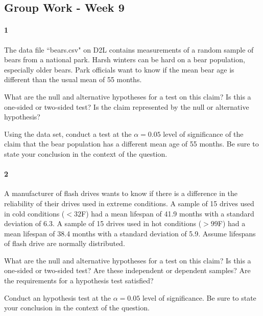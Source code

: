 \documentclass{article}
\begin{document}
\begin{flushleft}
\section*{Group Work - Week 9}

\paragraph{1} The data file ``bears.csv" on D2L contains measurements of a random sample of bears from a national park. Harsh winters can be hard on a bear population, especially older bears. Park officials want to know if the mean bear age is different than the usual mean of 55 months.

\begin{enumalpha}
\item What are the null and alternative hypotheses for a test on this claim? Is this a one-sided or two-sided test? Is the claim represented by the null or alternative hypothesis?
\vspace{2.5in}
\item Using the data set, conduct a test at the $\alpha = 0.05$ level of significance of the claim that the bear population has a different mean age of 55 months. Be sure to state your conclusion in the context of the question.
\end{enumalpha}

\newpage
\paragraph{2} A manufacturer of flash drives wants to know if there is a difference in the reliability of their drives used in extreme conditions. A sample of 15 drives used in cold conditions ($< 32 $\textdegree F) had a mean lifespan of 41.9 months with a standard deviation of 6.3. A sample of 15 drives used in hot conditions ($> 99 $\textdegree F) had a mean lifespan of 38.4 months with a standard deviation of 5.9. Assume lifespans of flash drive are normally distributed.
\begin{enumalpha}
\item What are the null and alternative hypotheses for a test on this claim? Is this a one-sided or two-sided test? Are these independent or dependent samples? Are the requirements for a hypothesis test satisfied?
\vspace{2.25in}
\item Conduct an hypothesis test at the $\alpha = 0.05$ level of significance. Be sure to state your conclusion in the context of the question.
\end{enumalpha}


\end{flushleft}
\end{document}
